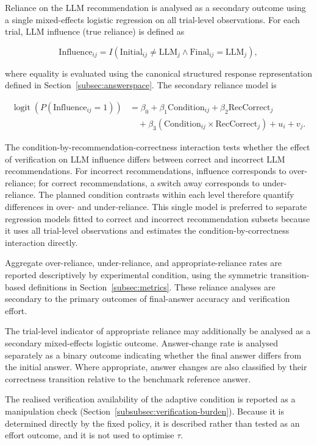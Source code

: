 \documentclass[oneside,final,14pt,a4paper]{extreport}
\begin{document}
Reliance on the LLM recommendation is analysed as a secondary outcome using a
single mixed-effects logistic regression on all trial-level observations. For
each trial, LLM influence (true reliance) is defined as

$$
\text{Influence}_{ij}
=
I(\text{Initial}_{ij}\neq\text{LLM}_{j}\land\text{Final}_{ij}=\text{LLM}_{j}),
$$

where equality is evaluated using the canonical structured response
representation defined in Section~\ref{subsec:answerspace}. The secondary
reliance model is

\[
\begin{aligned}
\operatorname{logit}\!\left(
P(\text{Influence}_{ij}=1)
\right)
&=
\beta_0
+
\beta_1\text{Condition}_{ij}
+
\beta_2\text{RecCorrect}_{j} \\
&\quad
+
\beta_3
\left(
\text{Condition}_{ij}
\times
\text{RecCorrect}_{j}
\right)
+
u_i
+
v_j.
\end{aligned}
\]

The condition-by-recommendation-correctness interaction tests whether the
effect of verification on LLM influence differs between correct and incorrect
LLM recommendations. For incorrect recommendations, influence corresponds to
over-reliance; for correct recommendations, a switch away corresponds to
under-reliance. The planned condition contrasts within each level therefore
quantify differences in over- and under-reliance. This single model is
preferred to separate regression models fitted to correct and incorrect
recommendation subsets because it uses all trial-level observations and
estimates the condition-by-correctness interaction directly.

Aggregate over-reliance, under-reliance, and appropriate-reliance rates are
reported descriptively by experimental condition, using the symmetric
transition-based definitions in Section~\ref{subsec:metrics}. These reliance
analyses are secondary to the primary outcomes of final-answer accuracy and
verification effort.

The trial-level indicator of appropriate reliance may additionally be
analysed as a secondary mixed-effects logistic outcome. Answer-change rate is
analysed separately as a binary outcome indicating whether the final answer
differs from the initial answer. Where appropriate, answer changes are also
classified by their correctness transition relative to the benchmark
reference answer.

The realised verification availability of the adaptive condition is reported
as a manipulation check (Section~\ref{subsubsec:verification-burden}). Because
it is determined directly by the fixed policy, it is described rather than
tested as an effort outcome, and it is not used to optimise $\tau$.
\end{document}
